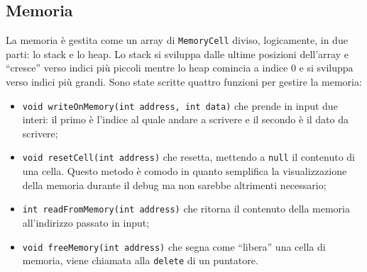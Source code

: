 \documentclass[../report.tex]{subfiles}
\begin{document}
\subsection{Memoria}\label{ss:memoria}
La memoria \`e gestita come un array di \verb|MemoryCell| diviso, logicamente, in due parti: lo stack e lo heap.
Lo stack si sviluppa dalle ultime posizioni dell'array e ``cresce'' verso indici pi\`u piccoli mentre lo heap comincia a indice 0 e si sviluppa verso indici pi\`u grandi.
Sono state scritte quattro funzioni per gestire la memoria:
\begin{itemize}
    \item \verb|void writeOnMemory(int address, int data)| che prende in input due interi: il primo \`e l'indice al quale andare a scrivere e il secondo \`e il dato da scrivere;
    \item \verb|void resetCell(int address)| che resetta, mettendo a \verb|null| il contenuto di una cella. Questo metodo \`e comodo in quanto semplifica la visualizzazione della memoria durante il debug ma non sarebbe altrimenti necessario;
    \item \verb|int readFromMemory(int address)| che ritorna il contenuto della memoria all'indirizzo passato in input;
    \item \verb|void freeMemory(int address)| che segna come ``libera'' una cella di memoria, viene chiamata alla \verb|delete| di un puntatore.
\end{itemize}
\end{document}
